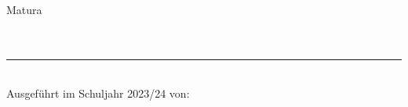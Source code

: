 	\begin{center}
	\vspace*{1cm}
	{\huge Matura}\\
	\bigskip
	{\LARGE \mytitle} \\
	\smallskip
	{\large \myschool} \\
	\bigskip
	\hrule
	\bigskip
	{\large \myinstitute} \\
	
	\bigskip
	Ausgeführt im Schuljahr 2023/24 von: \\
	\myauthor \\
	\bigskip


\end{center}
